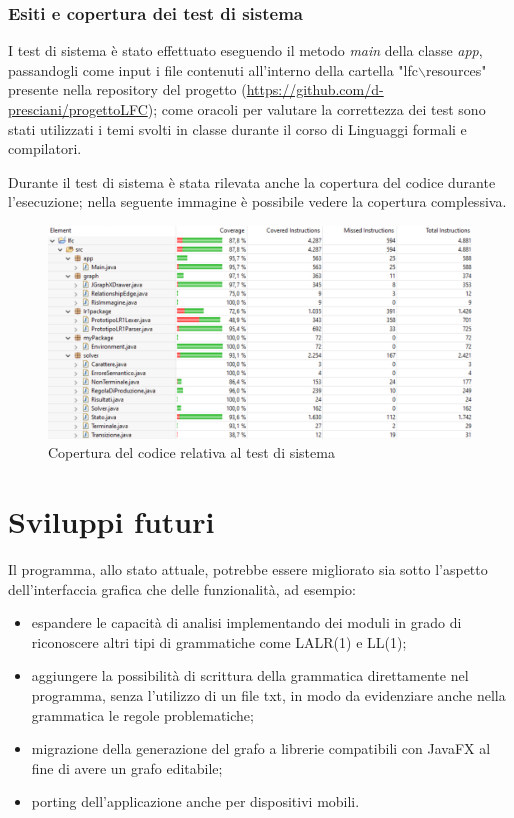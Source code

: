 \documentclass[12pt]{article}
\begin{document}
\subsubsection{Esiti e copertura dei test di sistema}
I test di sistema è stato effettuato eseguendo il metodo \textit{main} della classe \textit{app}, passandogli come input i file contenuti all'interno della cartella "lfc$\backslash$resources" presente nella repository del progetto (\url{https://github.com/d-presciani/progettoLFC}); come oracoli per valutare la correttezza dei test sono stati utilizzati i temi svolti in classe durante il corso di Linguaggi formali e compilatori. \par
Durante il test di sistema è stata rilevata anche la copertura del codice durante l'esecuzione; nella seguente immagine è possibile vedere la copertura complessiva.
\begin{figure}[h]
\centering
\includegraphics[width=\textwidth]{immagini/coverage.png}
\caption{Copertura del codice relativa al test di sistema}
\end{figure}
\pagebreak
\section{Sviluppi futuri}
Il programma, allo stato attuale, potrebbe essere migliorato sia sotto l'aspetto dell'interfaccia grafica che delle funzionalità, ad esempio:
\begin{itemize}
\item espandere le capacità di analisi implementando dei moduli in grado di riconoscere altri tipi di grammatiche come LALR(1) e LL(1);
\item aggiungere la possibilità di scrittura della grammatica direttamente nel programma, senza l'utilizzo di un file txt, in modo da evidenziare anche nella grammatica le regole problematiche;
\item migrazione della generazione del grafo a librerie compatibili con JavaFX al fine di avere un grafo editabile;
\item porting dell'applicazione anche per dispositivi mobili.
\end{itemize}
\end{document}
